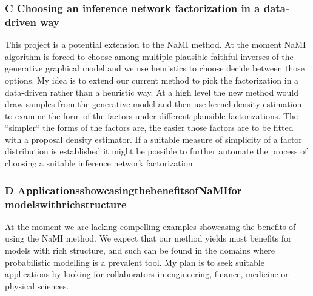 \documentclass[12pt]{article}
\begin{document}
\subsubsection*{C \quad Choosing an inference network factorization in a data-driven way}
This project is a potential extension to the NaMI method.
At the moment NaMI algorithm is forced to choose among multiple plausible faithful inverses of the generative graphical model and we use  heuristics to choose decide between those options.
My idea is to extend our current method to pick the factorization in a data-driven rather than a heuristic way.
At a high level the new method would draw samples from the generative model and then use kernel density estimation to examine the form of the factors under different plausible factorizations. 
The ``simpler`` the forms of the factors are, the easier those factors are to be fitted with a proposal density estimator.
If a suitable measure of simplicity of a factor distribution is established it might be possible to further automate the process of choosing a suitable inference network factorization.




\subsubsection*{D \quad Applications\hspace{.4em}showcasing\hspace{.4em}the\hspace{.4em}benefits\hspace{.4em}of\hspace{.4em}NaMI\hspace{.4em}for models\hspace{.4em}with\hspace{.4em}rich\hspace{.4em}structure}
At the moment we are lacking compelling examples showcasing the benefits of using the NaMI method.
We expect that our method yields most benefits for models with rich structure, and such can be found in the domains where probabilistic modelling is a prevalent tool.
My plan is to seek suitable applications by looking for collaborators in engineering, finance, medicine or physical sciences.
\end{document}
